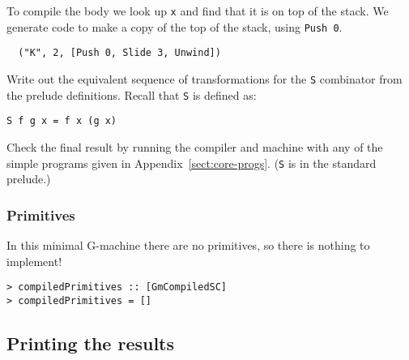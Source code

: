 To compile the body we look up \mbox{\tt x} and find that it is on top of the stack.
We generate code to make a copy of the top of the stack, using \mbox{\tt Push\ 0}.
\begin{verbatim}
  ("K", 2, [Push 0, Slide 3, Unwind])
\end{verbatim}

\begin{exercise}\label{gm:X:symbolic-compilation}
Write out the equivalent sequence of transformations for the \mbox{\tt S}
combinator from the prelude definitions. Recall that \mbox{\tt S} is defined as:
\begin{verbatim}
S f g x = f x (g x)
\end{verbatim}
Check the final result by running the compiler and machine with any of
the simple programs given in Appendix~\ref{sect:core-progs}. (\mbox{\tt S} is
in the standard prelude.)
\end{exercise}

\subsubsection{Primitives}

In this minimal G-machine there are no primitives, so there is nothing
to implement!
\begin{verbatim}
> compiledPrimitives :: [GmCompiledSC]
> compiledPrimitives = []
\end{verbatim}
%
%
\subsection{Printing the results}

